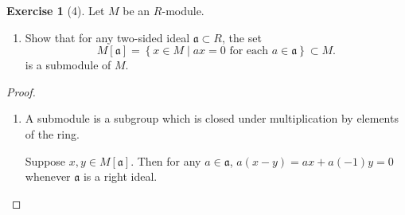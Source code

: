\documentclass[reqno]{amsart}
\theoremstyle{definition}
\newtheorem{exercise}[theorem]{Exercise}
\theoremstyle{remark}
\begin{document}
    \begin{exercise}[4]
        Let $M$ be an $R$-module.
        \begin{enumerate}
            \item Show that for any two-sided ideal
                $\mathfrak{a} \subset R$, the set
                \[
                M \left[ \mathfrak{a} \right] 
                = \left\{ x \in M
                 \mid ax = 0 \text{ for each }
             a \in \mathfrak{a} \right\} \subset 
             M.
                \] 
              is a submodule of $M$.  
        \end{enumerate}
    \end{exercise}


    \begin{proof}
        \begin{enumerate}
            \item A submodule is a subgroup which is
                closed under multiplication by
                elements of the ring.

                Suppose $x,y \in 
                M\left[ \mathfrak{a} \right] $. Then
                for any $a \in \mathfrak{a}$,
                $a \left( x-y \right) 
                = ax + a (-1)y
                = 0$ whenever $\mathfrak{a}$ is a right
                ideal.


\end{enumerate}
\end{proof}
\end{document}
